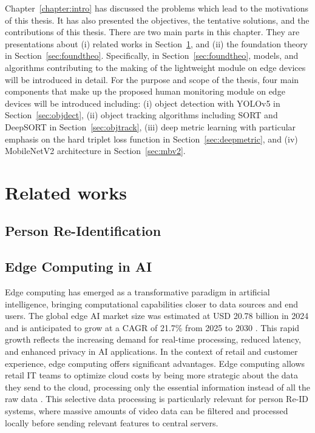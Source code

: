 \documentclass[../main.tex]{subfiles}
\begin{document}
Chapter~\ref{chapter:intro} has discussed the problems which lead to the motivations of this thesis. It has also presented the objectives, the tentative solutions, and the contributions of this thesis. There are two main parts in this chapter. They are presentations about (i) related works in Section~\ref{sec:related}, and (ii) the foundation theory in Section~\ref{sec:foundtheo}. Specifically, in Section~\ref{sec:foundtheo}, models, and algorithms contributing to the making of the lightweight module on edge devices will be introduced in detail. For the purpose and scope of the thesis, four main components that make up the proposed human monitoring module on edge devices will be introduced including: (i) object detection with YOLOv5 in Section~\ref{sec:objdect}, (ii) object tracking algorithms including SORT and DeepSORT in Section~\ref{sec:objtrack}, (iii) deep metric learning with particular emphasis on the hard triplet loss function in Section~\ref{sec:deepmetric}, and (iv) MobileNetV2 architecture in Section~\ref{sec:mbv2}.

\section{Related works}
\label{sec:related}


\subsection{Person Re-Identification}
\label{sec:personreid}



\subsection{Edge Computing in AI}
\label{sec:edgecomputing}

Edge computing has emerged as a transformative paradigm in artificial intelligence, bringing computational capabilities closer to data sources and end users. The global edge AI market size was estimated at USD 20.78 billion in 2024 and is anticipated to grow at a CAGR of 21.7\% from 2025 to 2030 \cite{grandview2024}. This rapid growth reflects the increasing demand for real-time processing, reduced latency, and enhanced privacy in AI applications.
In the context of retail and customer experience, edge computing offers significant advantages. Edge computing allows retail IT teams to optimize cloud costs by being more strategic about the data they send to the cloud, processing only the essential information instead of all the raw data \cite{biztech2024}. This selective data processing is particularly relevant for person Re-ID systems, where massive amounts of video data can be filtered and processed locally before sending relevant features to central servers.
\end{document}
